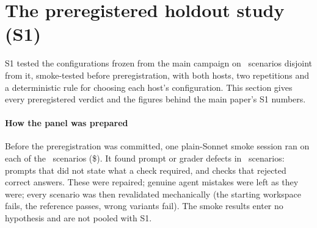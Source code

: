 \section{The preregistered holdout study (S1)}\label{sec:s1}

S1 tested the configurations frozen from the main campaign on \SOnePanelN\ scenarios disjoint from it, smoke-tested
before preregistration, with both hosts, two repetitions and a deterministic rule for choosing each host's
configuration. This section gives every preregistered verdict and the figures behind the main paper's S1 numbers.

\paragraph{How the panel was prepared} Before the preregistration was committed, one plain-Sonnet smoke session ran on
each of the \SmokeN\ scenarios (\$\SmokeUSD). It found prompt or grader defects in \SmokeFixed\ scenarios: prompts that
did not state what a check required, and checks that rejected correct answers. These were repaired; genuine agent
mistakes were left as they were; every scenario was then revalidated mechanically (the starting workspace fails, the
reference passes, wrong variants fail). The smoke results enter no hypothesis and are not pooled with S1.

